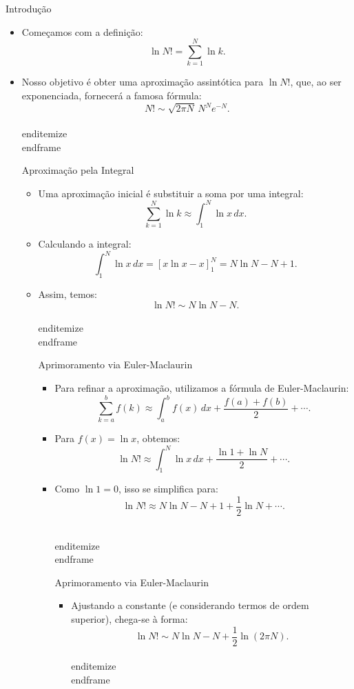 \documentclass[11pt]{beamer}
\begin{document}
\begin{frame}
\begin{frame}
\begin{itemize}
\begin{frame}{Introdução}
  \begin{itemize}
    \item Começamos com a definição:
      \[
      \ln N! = \sum_{k=1}^{N} \ln k.
      \]
    \item Nosso objetivo é obter uma aproximação assintótica para $\ln N!$, que, ao ser exponenciada, fornecerá a famosa fórmula:
      \[
      N! \sim \sqrt{2\pi N}\, N^N e^{-N}.
      \]
  \\end{itemize}
\\end{frame}

\begin{frame}{Aproximação pela Integral}
  \begin{itemize}
    \item Uma aproximação inicial é substituir a soma por uma integral:
      \[
      \sum_{k=1}^{N} \ln k \approx \int_{1}^{N} \ln x\,dx.
      \]
    \item Calculando a integral:
      \[
      \int_{1}^{N} \ln x\,dx = \left[ x\ln x - x \right]_1^N = N\ln N - N + 1.
      \]
    \item Assim, temos:
      \[
      \ln N! \sim N\ln N - N.
      \]
  \\end{itemize}
\\end{frame}

\begin{frame}{Aprimoramento via Euler-Maclaurin}
  \begin{itemize}
    \item Para refinar a aproximação, utilizamos a fórmula de Euler-Maclaurin:
      \[
      \sum_{k=a}^{b} f(k) \approx \int_{a}^{b} f(x)\,dx + \frac{f(a)+f(b)}{2} + \cdots.
      \]
    \item Para $f(x)=\ln x$, obtemos:
      \[
      \ln N! \approx \int_{1}^{N} \ln x\,dx + \frac{\ln 1 + \ln N}{2} + \cdots.
      \]
    \item Como $\ln 1=0$, isso se simplifica para:
      \[
      \ln N! \approx N\ln N - N + 1 + \frac{1}{2}\ln N + \cdots.
      \]

  \\end{itemize}
\\end{frame}
      
\begin{frame}{Aprimoramento via Euler-Maclaurin}
  \begin{itemize}
    \item Ajustando a constante (e considerando termos de ordem superior), chega-se à forma:
      \[
      \ln N! \sim N\ln N - N + \frac{1}{2}\ln(2\pi N).
      \]
  \\end{itemize}
\\end{frame}


\end{itemize}
\end{frame}
\end{itemize}
\end{frame}
\end{itemize}
\end{frame}
\end{itemize}
\end{frame}
\end{itemize}
\end{frame}
\end{frame}
\end{document}
